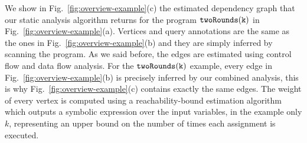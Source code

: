  
%
We show in Fig.~\ref{fig:overview-example}(c) the estimated dependency graph that our static analysis algorithm returns for the program $\mathtt{twoRounds(k)}$ in Fig.~\ref{fig:overview-example}(a).
Vertices and query annotations are the same as the ones in Fig.~\ref{fig:overview-example}(b) and they are simply inferred by scanning the program.
As we said before, the edges are estimated using control flow and data flow analysis.
For the $\mathtt{twoRounds(k)}$ example, every edge in Fig.~\ref{fig:overview-example}(b) is precisely inferred by our combined analysis, this is why Fig.~\ref{fig:overview-example}(c) contains exactly the same edges.
The weight of every vertex is computed using a reachability-bound estimation algorithm which outputs a symbolic expression over the input variables, in the example only $k$, representing an upper bound on the number of times each assignment is executed.
